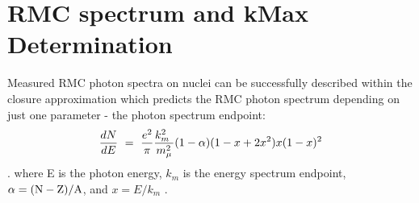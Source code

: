 \newpage
\section {RMC spectrum and kMax Determination}

Measured RMC photon spectra on nuclei can be successfully described within 
the closure approximation which predicts the RMC photon spectrum depending
on just one parameter - the photon spectrum endpoint:
$$
    {dN \over dE} ~=~ {e^2 \over \pi } {k_m^2 \ \over m_{\mu}^2} (1 - \alpha) (1-x+2x^2)x(1-x)^2
$$
. where E is the photon energy, $k_m$ is the energy spectrum endpoint, $\rm \alpha = (N-Z)/A$,
and $x = E/k_m$  \cite{Christillin_1980}.


